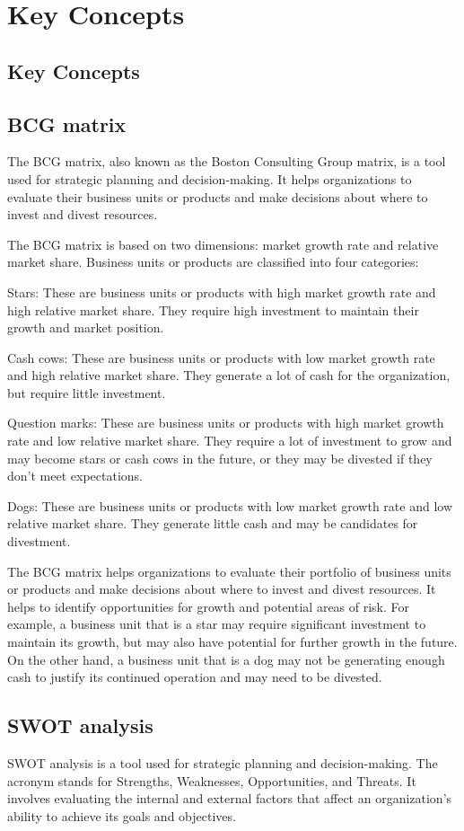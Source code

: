 \documentclass[12pt, a4paper, oneside]{article}
\begin{document}
\section{Key Concepts}
\subsection{Key Concepts }
\subsection{ BCG matrix }
The BCG matrix, also known as the Boston Consulting Group matrix, is a tool used for strategic planning and decision-making. It helps organizations to evaluate their business units or products and make decisions about where to invest and divest resources.

The BCG matrix is based on two dimensions: market growth rate and relative market share. Business units or products are classified into four categories:

Stars: These are business units or products with high market growth rate and high relative market share. They require high investment to maintain their growth and market position.

Cash cows: These are business units or products with low market growth rate and high relative market share. They generate a lot of cash for the organization, but require little investment.

Question marks: These are business units or products with high market growth rate and low relative market share. They require a lot of investment to grow and may become stars or cash cows in the future, or they may be divested if they don't meet expectations.

Dogs: These are business units or products with low market growth rate and low relative market share. They generate little cash and may be candidates for divestment.

The BCG matrix helps organizations to evaluate their portfolio of business units or products and make decisions about where to invest and divest resources. It helps to identify opportunities for growth and potential areas of risk. For example, a business unit that is a star may require significant investment to maintain its growth, but may also have potential for further growth in the future. On the other hand, a business unit that is a dog may not be generating enough cash to justify its continued operation and may need to be divested.
\subsection{ SWOT analysis }
SWOT analysis is a tool used for strategic planning and decision-making. The acronym stands for Strengths, Weaknesses, Opportunities, and Threats. It involves evaluating the internal and external factors that affect an organization's ability to achieve its goals and objectives.
\end{document}
